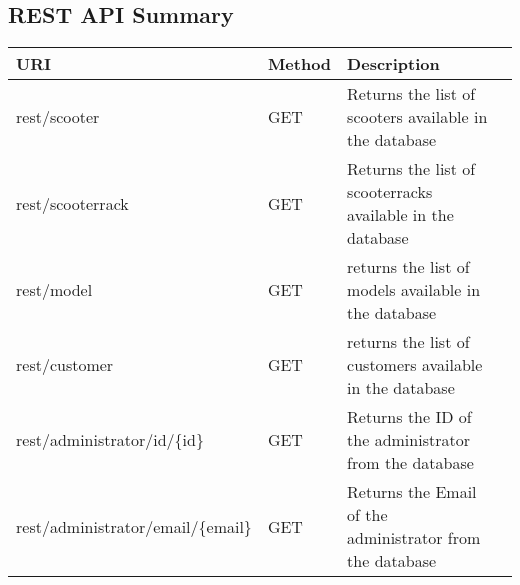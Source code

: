 \subsection{REST API Summary}


\caption{ The list of the rest API for this homweork are still "in progress" because we have to decide according to the frontend where it is better to use a REST call or not. There are some resources we used for rest in the next table.}

\begin{longtable}{|p{}|p{} |p{}|p{}|} 
\hline
\textbf{URI} & \textbf{Method} & \textbf{Description}  \\\hline
rest/scooter & GET &  Returns the list of scooters available in the database \\\hline
rest/scooterrack & GET & Returns the list of scooterracks available in the database \\\hline
rest/model & GET & returns the list of models available in the database \\\hline  
rest/customer & GET & returns the list of customers available in the database \\\hline

rest/administrator/id/\{id\} & GET & Returns the ID of the administrator from the database\\\hline


rest/administrator/email/\{email\} & GET & Returns the Email of the administrator from the database\\\hline




\end{longtable}
